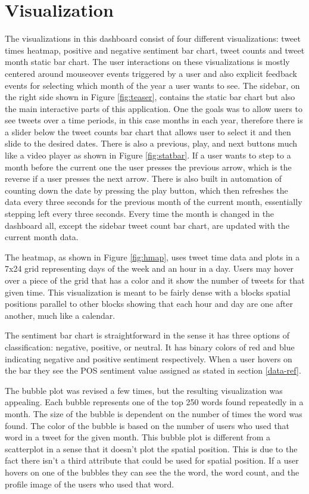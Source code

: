 \documentclass[journal]{vgtc}                %
\begin{document}
\section{Visualization}

The visualizations in this dashboard consist of four different visualizations: tweet times heatmap, positive and negative sentiment bar chart, tweet counts and tweet month static bar chart. 
The user interactions on these visualizations is mostly centered around mouseover events triggered by a user and also explicit feedback events for selecting which month of the year a user wants to see.
The sidebar, on the right side shown in Figure \ref{fig:teaser}, contains the static bar chart but also the main interactive parts of this application.
One the goals was to allow users to see tweets over a time periods, in this case months in each year, therefore there is a slider below the tweet counts bar chart that allows user to select it and then slide to the desired dates. 
There is also a previous, play, and next buttons much like a video player as shown in Figure \ref{fig:statbar}.
If a user wants to step to a month before the current one the user presses the previous arrow, which is the reverse if a user presses the next arrow.
There is also built in automation of counting down the date by pressing the play button, which then refreshes the data every three seconds for the previous month of the current month, essentially stepping left every three seconds.
Every time the month is changed in the dashboard all, except the sidebar tweet count bar chart, are updated with the current month data.

The heatmap, as shown in Figure \ref{fig:hmap}, uses tweet time data and plots in a 7x24 grid representing days of the week and an hour in a day.
Users may hover over a piece of the grid that has a color and it show the number of tweets for that given time.
This visualization is meant to be fairly dense with a blocks spatial positions parallel to other blocks showing that each hour and day are one after another, much like a calendar.

The sentiment bar chart is straightforward in the sense it has three options of classification: negative, positive, or neutral.
It has binary colors of red and blue indicating negative and positive sentiment respectively.
When a user hovers on the bar they see the POS sentiment value assigned as stated in section \ref{data-ref}.

The bubble plot was revised a few times, but the resulting visualization was appealing.
Each bubble represents one of the top 250 words found repeatedly in a month.
The size of the bubble is dependent on the number of times the word was found.
The color of the bubble is based on the number of users who used that word in a tweet for the given month.
This bubble plot is different from a scatterplot in a sense that it doesn't plot the spatial position.
This is due to the fact there isn't a third attribute that could be used for spatial position.
If a user hovers on one of the bubbles they can see the the word, the word count, and the profile image of the users who used that word.
\end{document}
